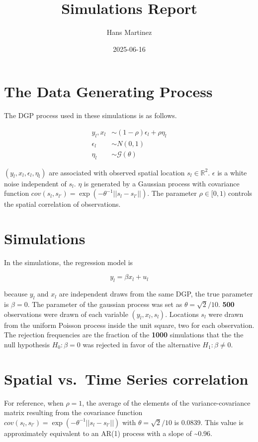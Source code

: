 \documentclass[
]{article}
\title{Simulations Report}
\author{Hans Martinez}
\date{2025-06-16}
\begin{document}
\maketitle

\section{The Data Generating Process}\label{the-data-generating-process}

The DGP process used in these simulations is as follows.

\[
\begin{aligned}
    y_l, x_l &\sim (1-\rho)\epsilon_l +\rho \eta_l \\
    \epsilon_l &\sim N(0,1) \\
    \eta_l &\sim \mathcal{G}(\theta)
\end{aligned}
\]

\((y_l,x_l,\epsilon_l,\eta_l)\) are associated with observed spatial
location \(s_l \in \mathbb{R}^2\). \(\epsilon\) is a white noise
independent of \(s_l\). \(\eta\) is generated by a Gaussian process with
covariance function
\(cov(s_l,s_{l'})=\exp(-\theta^{-1}||s_l-s_{l'}||)\). The parameter
\(\rho\in[0,1)\) controls the spatial correlation of observations.

\section{Simulations}\label{simulations}

In the simulations, the regression model is

\[
    y_l=\beta x_l + u_l
\]

because \(y_l\) and \(x_l\) are independent draws from the same DGP, the
true parameter is \(\beta=0\). The parameter of the gaussian process was
set as \(\theta=\sqrt{2}/10\). \textbf{500} observations were drawn of
each variable \((y_l,x_l,s_l)\). Locations \(s_l\) were drawn from the
uniform Poisson process inside the unit square, two for each
observation. The rejection frequencies are the fraction of the
\textbf{1000} simulations that the the null hypothesis \(H_0: \beta=0\)
was rejected in favor of the alternative \(H_1: \beta\not=0\).

\section{Spatial vs.~Time Series correlation}\label{sec-ar1}

For reference, when \(\rho=1\), the average of the elements of the
variance-covariance matrix resulting from the covariance function
\(cov(s_l,s_{l'})=\exp(-\theta^{-1}||s_l-s_{l'}||)\) with
\(\theta=\sqrt{2}/10\) is 0.0839. This value is approximately equivalent
to an AR(1) process with a slope of \textasciitilde0.96.
\end{document}
